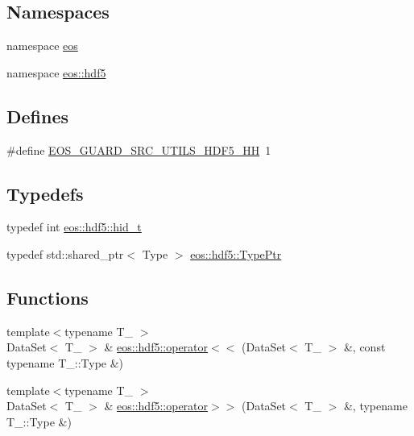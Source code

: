 \subsection*{Namespaces}
\begin{DoxyCompactItemize}
\item 
namespace \hyperlink{namespaceeos}{eos}
\item 
namespace \hyperlink{namespaceeos_1_1hdf5}{eos::hdf5}
\end{DoxyCompactItemize}
\subsection*{Defines}
\begin{DoxyCompactItemize}
\item 
\#define \hyperlink{hdf5_8hh_ab9d243c1633b2b4f6e51b80f8300d92e}{EOS\_\-GUARD\_\-SRC\_\-UTILS\_\-HDF5\_\-HH}~1
\end{DoxyCompactItemize}
\subsection*{Typedefs}
\begin{DoxyCompactItemize}
\item 
typedef int \hyperlink{namespaceeos_1_1hdf5_a5bd5e209f1bf36cdc5551465dacf2e74}{eos::hdf5::hid\_\-t}
\item 
typedef std::shared\_\-ptr$<$ Type $>$ \hyperlink{namespaceeos_1_1hdf5_ac960ca8a290b8a26ab5f71585ac5d793}{eos::hdf5::TypePtr}
\end{DoxyCompactItemize}
\subsection*{Functions}
\begin{DoxyCompactItemize}
\item 
{\footnotesize template$<$typename T\_\- $>$ }\\DataSet$<$ T\_\- $>$ \& \hyperlink{namespaceeos_1_1hdf5_a8da5ea7dae12acf02081ea4fc320dc3a}{eos::hdf5::operator$<$$<$} (DataSet$<$ T\_\- $>$ \&, const typename T\_\-::Type \&)
\item 
{\footnotesize template$<$typename T\_\- $>$ }\\DataSet$<$ T\_\- $>$ \& \hyperlink{namespaceeos_1_1hdf5_a59f5217285970b223b8a4932b811106e}{eos::hdf5::operator$>$$>$} (DataSet$<$ T\_\- $>$ \&, typename T\_\-::Type \&)
\end{DoxyCompactItemize}



